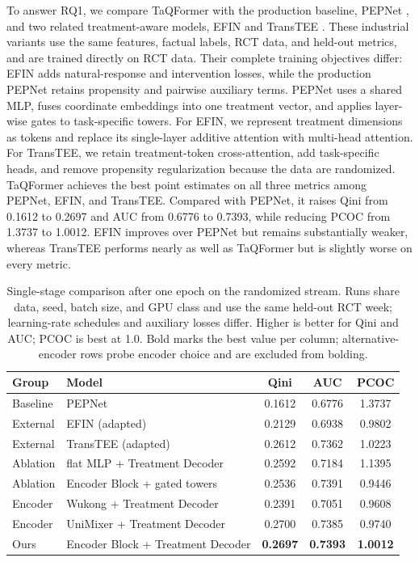 \documentclass[sigconf,nonacm]{acmart}
\newcommand{\model}{TaQFormer\xspace}
\begin{document}
To answer RQ1, we compare \model with the production baseline, PEPNet
\cite{chang2023pepnet}, and two related treatment-aware models, EFIN
\cite{liu2023explicit} and TransTEE \cite{zhang2023exploring}. These industrial variants use the same features, factual labels, RCT data, and held-out metrics, and are trained directly on RCT data. Their complete training objectives differ: EFIN adds natural-response and intervention losses, while the production PEPNet retains propensity and pairwise auxiliary terms. PEPNet uses a shared MLP, fuses coordinate embeddings into one
treatment vector, and applies layer-wise gates to task-specific
towers. For EFIN, we represent treatment dimensions as tokens and replace its
single-layer additive attention with multi-head attention. For TransTEE, we
retain treatment-token cross-attention, add task-specific heads, and remove
propensity regularization because the data are randomized. \model achieves the best point estimates on all three metrics among PEPNet, EFIN, and TransTEE. Compared with
PEPNet, it raises Qini from 0.1612 to 0.2697 and AUC from 0.6776 to 0.7393,
while reducing PCOC from 1.3737 to 1.0012. EFIN improves over PEPNet but
remains substantially weaker, whereas TransTEE performs nearly as well as
\model but is slightly worse on every metric.


\begin{table}[t]
  \centering
  \small
  \setlength{\tabcolsep}{3pt}
  \caption{Single-stage comparison after one epoch on the randomized stream. Runs share data, seed, batch size, and GPU class and use the same held-out RCT week; learning-rate schedules and auxiliary losses differ. Higher is better for Qini and AUC; PCOC is best at 1.0. Bold marks the best value per column; alternative-encoder rows probe encoder choice and are excluded from bolding.}
  \label{tab:offline-main-results}
  \begin{tabular}{>{\raggedright\arraybackslash}p{1.25cm}>{\raggedright\arraybackslash}p{3.05cm}ccc}
    \toprule
    Group & Model & Qini & AUC & PCOC \\
    \midrule
    Baseline & PEPNet & 0.1612 & 0.6776 & 1.3737 \\
    \midrule
    External & EFIN (adapted) & 0.2129 & 0.6938 & 0.9802 \\
    External & TransTEE (adapted) & 0.2612 & 0.7362 & 1.0223 \\
    \midrule
    Ablation & flat MLP + Treatment Decoder & 0.2592 & 0.7184 & 1.1395 \\
    Ablation & Encoder Block + gated towers & 0.2536 & 0.7391 & 0.9446 \\
    \midrule
    Encoder & Wukong + Treatment Decoder & 0.2391 & 0.7051 & 0.9608 \\
    Encoder & UniMixer + Treatment Decoder & 0.2700 & 0.7385 & 0.9740 \\
    \midrule
    Ours & Encoder Block + Treatment Decoder & \textbf{0.2697} & \textbf{0.7393} & \textbf{1.0012} \\
    \bottomrule
  \end{tabular}
\end{table}
\end{document}
